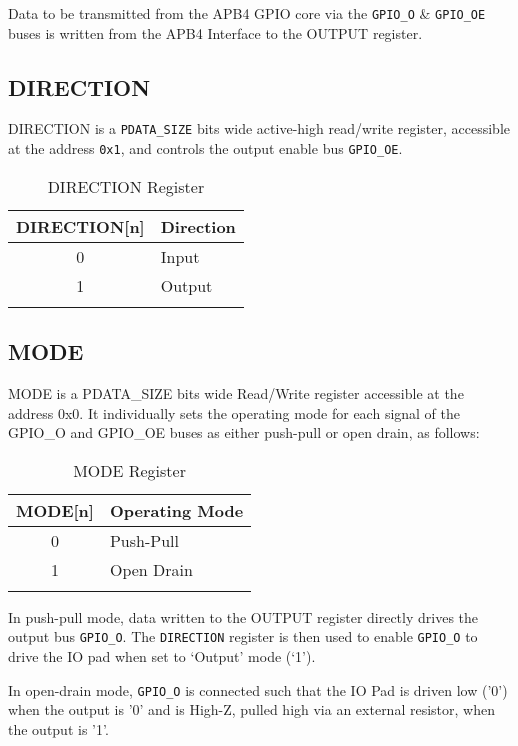 Data to be transmitted from the APB4 GPIO core via the \texttt{GPIO\_O} \&
\texttt{GPIO\_OE} buses is written from the APB4 Interface to the OUTPUT
register.

\subsection{DIRECTION}\label{direction}

DIRECTION is a \texttt{PDATA\_SIZE} bits
wide active-high read/write register, accessible at the address \texttt{0x1}, and
controls the output enable bus \texttt{GPIO\_OE}.

\begin{longtable}[]{@{}cl@{}}
\toprule
\textbf{DIRECTION[n]} & \textbf{Direction}\tabularnewline
\midrule
\endhead
0 & Input\tabularnewline
1 & Output\tabularnewline
\bottomrule
\caption{DIRECTION Register}
\end{longtable}

\subsection{MODE}\label{mode}

MODE is a PDATA\_SIZE bits wide Read/Write register accessible at the
address 0x0. It individually sets the operating mode for each signal of
the GPIO\_O and GPIO\_OE buses as either push-pull or open drain, as
follows:

\begin{longtable}[]{@{}cl@{}}
\toprule
\textbf{MODE[n]} & \textbf{Operating Mode}\tabularnewline
\midrule
\endhead
0 & Push-Pull\tabularnewline
1 & Open Drain\tabularnewline
\bottomrule
\caption{MODE Register}
\end{longtable}

In push-pull mode, data written to the OUTPUT register directly drives
the output bus \texttt{GPIO\_O}. The \texttt{DIRECTION} register is then used to enable
\texttt{GPIO\_O} to drive the IO pad when set to `Output' mode (`1').

In open-drain mode, \texttt{GPIO\_O} is connected such that the IO Pad is driven low ('0') when the output is '0' and is High-Z, pulled high via an external resistor, when the output is '1'.

